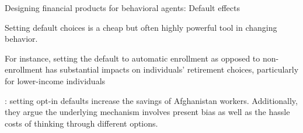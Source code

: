 \documentclass[aspectratio=169, 10pt, handout]{beamer}
\newenvironment{wideitemize}{\itemize\addtolength{\itemsep}{10pt}}{\enditemize}
\begin{document}
\begin{frame}{Designing financial products for behavioral agents: Default effects}

\begin{wideitemize}

	\item Setting default choices is a cheap but often highly powerful tool in changing behavior. 
	
	\item For instance, setting the default to automatic enrollment as opposed to non-enrollment has substantial impacts on individuals' retirement choices, particularly for lower-income individuals \citep{chetty2015behavioral, chetty2014active,madrian2001power}

	\item \cite{blumenstock2018defaults}: setting opt-in defaults increase the savings of Afghanistan workers. Additionally, they argue the underlying mechanism involves present bias as well as the hassle costs of thinking through different options.


\end{wideitemize}

\end{frame}
\end{document}
